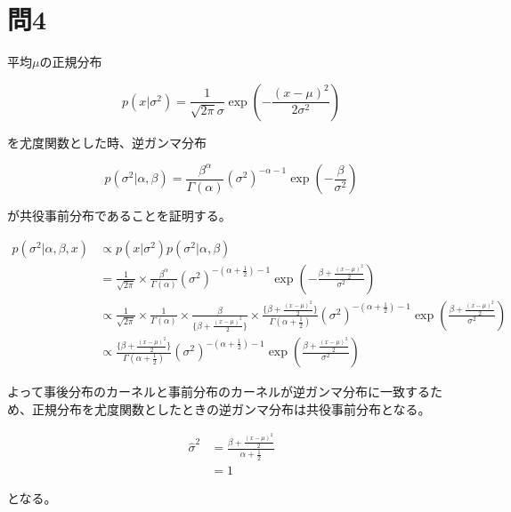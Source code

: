 \section{問4}
\hspace{1em}平均\(\mu\)の正規分布

\begin{equation}
    p(x | \sigma^2) = \frac{1}{\sqrt{2\pi}\sigma} \exp(-\frac{(x - \mu)^2}{2\sigma^2})
\end{equation}

\noindent を尤度関数とした時、逆ガンマ分布

\begin{equation}
    p(\sigma^2 | \alpha, \beta) = \frac{\beta^{\alpha}}{\Gamma(\alpha)}(\sigma^2)^{-\alpha-1}\exp(-\frac{\beta}{\sigma^2})
\end{equation}

\noindent が共役事前分布であることを証明する。

\begin{align}
    p(\sigma^2 | \alpha, \beta, x)  &\propto p(x | \sigma^2)p(\sigma^2 | \alpha, \beta) \\
                                    &= \frac{1}{\sqrt{2\pi}} \times \frac{\beta^{\alpha}}{\Gamma(\alpha)}(\sigma^2)^{-(\alpha + \frac{1}{2})-1} \exp(-\frac{\beta + \frac{(x - \mu)^2}{2}}{\sigma^2}) \\
                                    &\propto \frac{1}{\sqrt{2\pi}} \times \frac{1}{\Gamma(\alpha)} \times \frac{\beta}{\{\beta + \frac{(x - \mu)^2}{2}\}} \times \frac{\{\beta + \frac{(x - \mu)^2}{2}\}}{\Gamma(\alpha + \frac{1}{2})}(\sigma^2)^{-(\alpha + \frac{1}{2}) - 1} \exp(\frac{\beta + \frac{(x - \mu)^2}{2}}{\sigma^2}) \\
                                    &\propto \frac{\{\beta + \frac{(x - \mu)^2}{2}\}}{\Gamma(\alpha + \frac{1}{2})}(\sigma^2)^{-(\alpha + \frac{1}{2}) - 1} \exp(\frac{\beta + \frac{(x - \mu)^2}{2}}{\sigma^2})
\end{align}

よって事後分布のカーネルと事前分布のカーネルが逆ガンマ分布に一致するため、正規分布を尤度関数としたときの逆ガンマ分布は共役事前分布となる。


\begin{align}
    \hat{\sigma}^2  &= \frac{\beta + \frac{(x - \mu)^2}{2}}{\alpha + \frac{1}{2}} \\
                    &= 1
\end{align}

\noindent となる。